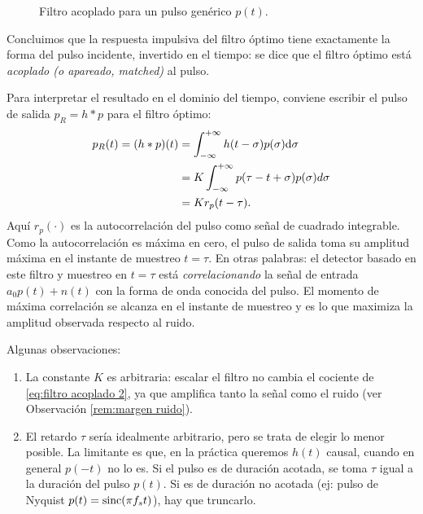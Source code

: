 \begin{figure}[htb]
    \begin{center}
    \end{center}
    \caption{Filtro acoplado para un pulso genérico $p(t)$.}\label{fig:filtro acoplado}
\end{figure}

Concluimos que la respuesta impulsiva del filtro óptimo tiene exactamente la forma del pulso incidente, invertido en el tiempo: se dice que el filtro óptimo está \emph{acoplado (o apareado, matched)}  al pulso.

Para interpretar el resultado en el dominio del tiempo, conviene escribir el pulso de salida $p_R =h* p$ para el filtro óptimo:
\begin{align*}
            p_R(t) = (h\ast p) (t)  & = \int_{-\infty}^{+\infty} h(t-\sigma) p (\sigma)\mathrm{d} \sigma\\
            & = K \int_{-\infty}^{+\infty} p(\tau - t + \sigma) p (\sigma)d \sigma \\ & = K r_p(t - \tau).
\end{align*}
Aquí $r_p(\cdot)$ es la autocorrelación del pulso como señal de cuadrado integrable. Como la autocorrelación es máxima en cero, el pulso de salida toma su amplitud máxima en el instante de muestreo $t=\tau$. En otras palabras: el detector basado en este filtro y muestreo en $t=\tau$ está \emph{correlacionando} la señal de entrada $a_0 p(t) + n(t)$ con la forma de onda conocida del pulso. El momento de máxima correlación se alcanza en el instante de muestreo y es lo que maximiza la amplitud observada respecto al ruido.

Algunas observaciones:
\begin{enumerate}
    \item La constante $K$ es arbitraria: escalar el filtro no cambia el cociente de \eqref{eq:filtro acoplado 2}, ya que amplifica tanto la señal como el ruido (ver Observación \ref{rem:margen ruido}).
    \item El retardo $\tau$ sería idealmente arbitrario, pero se trata de elegir lo menor posible. La limitante es que, en la práctica queremos $h(t)$ causal, cuando en general $p(-t)$ no lo es. Si el pulso es de duración acotada, se toma $\tau$ igual a la duración del pulso $p(t)$. Si es de duración no acotada (ej: pulso de Nyquist $p(t)=\operatorname{sinc}(\pi f_s t)$), hay que truncarlo.
\end{enumerate}

